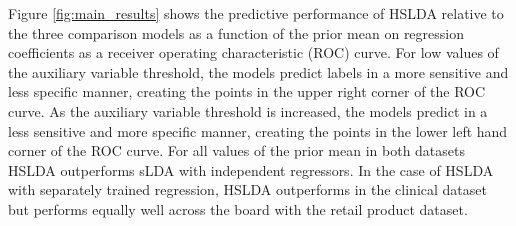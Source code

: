 Figure \ref{fig:main_results} shows the predictive performance of HSLDA 
relative to the three comparison models as a function of the prior mean
on regression coefficients as a receiver operating characteristic (ROC) curve. 
For low values of the auxiliary variable threshold, the models predict labels
in a more sensitive and less specific manner, creating the points in the upper
right corner of the ROC curve. As the auxiliary variable threshold is
increased, the models predict in a less sensitive and more specific manner,
creating the points in the lower left hand corner of the ROC curve. For all
values of the prior mean in both datasets HSLDA outperforms sLDA with
independent regressors. In the case of HSLDA with separately trained
regression, HSLDA outperforms in the clinical dataset but performs equally well
across the board with the retail product dataset. 

